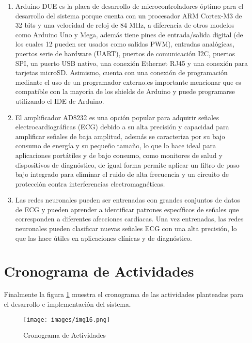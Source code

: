 \begin{enumerate}
    \item Arduino DUE es la placa de desarrollo de microcontroladores óptimo para el desarrollo del sistema porque cuenta con un procesador ARM Cortex-M3 de 32 bits y una velocidad de reloj de 84 MHz, a diferencia de otros modelos como Arduino Uno y Mega, además tiene pines de entrada/salida digital (de los cuales 12 pueden ser usados como salidas PWM), entradas analógicas, puertos serie de hardware (UART), puertos de comunicación I2C, puertos SPI, un puerto USB nativo, una conexión Ethernet RJ45 y una conexión para tarjetas microSD. Asimismo, cuenta con una conexión de programación mediante el uso de un programador externo.es importante mencionar que es compatible con la mayoría de los shields de Arduino y puede programarse utilizando el IDE de Arduino.
    \item El amplificador AD8232 es una opción popular para adquirir señales electrocardiográficas (ECG) debido a su alta precisión y capacidad para amplificar señales de baja amplitud, además se caracteriza por su  bajo consumo de energía y su pequeño tamaño, lo que lo hace ideal para aplicaciones portátiles y de bajo consumo, como monitores de salud y dispositivos de diagnóstico, de igual forma permite aplicar un filtro de paso bajo integrado para eliminar el ruido de alta frecuencia y un circuito de protección contra interferencias electromagnéticas.
    \item Las redes neuronales pueden ser entrenadas con grandes conjuntos de datos de ECG y pueden aprender a identificar patrones específicos de señales que corresponden a diferentes afecciones cardíacas. Una vez entrenadas, las redes neuronales pueden clasificar nuevas señales ECG con una alta precisión, lo que las hace útiles en aplicaciones clínicas y de diagnóstico.
\end{enumerate}

\section{Cronograma de Actividades}


Finalmente la figura \ref{fig:Crono} muestra el cronograma de las actividades planteadas para el desarrollo e implementación del sistema.

\begin{figure}[!ht]
    \centering
    \texttt{[image: images/img16.png]}
    \caption{Cronograma de Actividades}
    \label{fig:Crono}
\end{figure}

